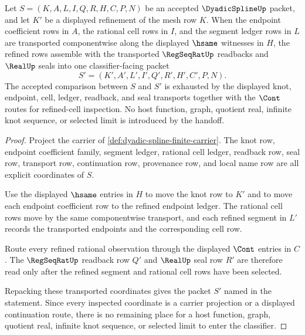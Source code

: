 \begin{theorem}
\label{thm:dyadic-spline-endpoint-mesh-transport-stability}
Let $S=(K,A,L,I,Q,R,H,C,P,N)$ be an accepted $\DyadicSplineUp$ packet, and let $K'$ be a displayed refinement of the mesh row $K$. When the endpoint coefficient rows in $A$, the rational cell rows in $I$, and the segment ledger rows in $L$ are transported componentwise along the displayed $\hsame$ witnesses in $H$, the refined rows assemble with the transported $\RegSeqRatUp$ readbacks and $\RealUp$ seals into one classifier-facing packet
$$
S'=(K',A',L',I',Q',R',H',C',P,N).
$$
The accepted comparison between $S$ and $S'$ is exhausted by the displayed knot, endpoint, cell, ledger, readback, and seal transports together with the $\Cont$ routes for refined-cell inspection. No host function, graph, quotient real, infinite knot sequence, or selected limit is introduced by the handoff.
\end{theorem}
\begin{proof}
Project the carrier of \autoref{def:dyadic-spline-finite-carrier}. The knot row, endpoint coefficient family, segment ledger, rational cell ledger, readback row, seal row, transport row, continuation row, provenance row, and local name row are all explicit coordinates of $S$.

Use the displayed $\hsame$ entries in $H$ to move the knot row to $K'$ and to move each endpoint coefficient row to the refined endpoint ledger. The rational cell rows move by the same componentwise transport, and each refined segment in $L'$ records the transported endpoints and the corresponding cell row.

Route every refined rational observation through the displayed $\Cont$ entries in $C$. The $\RegSeqRatUp$ readback row $Q'$ and $\RealUp$ seal row $R'$ are therefore read only after the refined segment and rational cell rows have been selected.

Repacking these transported coordinates gives the packet $S'$ named in the statement. Since every inspected coordinate is a carrier projection or a displayed continuation route, there is no remaining place for a host function, graph, quotient real, infinite knot sequence, or selected limit to enter the classifier.
\end{proof}

